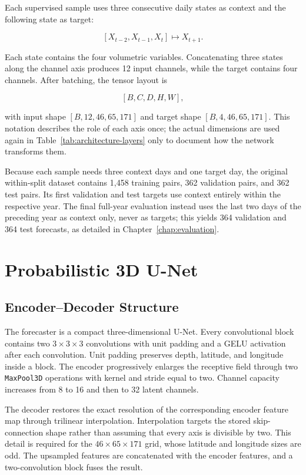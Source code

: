 Each supervised sample uses three consecutive daily states as context and the following state as target:

\[
[X_{t-2},X_{t-1},X_t] \longmapsto X_{t+1}.
\]

Each state contains the four volumetric variables. Concatenating three states along the channel axis produces 12 input channels, while the target contains four channels. After batching, the tensor layout is

\[
[B,C,D,H,W],
\]

with input shape $[B,12,46,65,171]$ and target shape $[B,4,46,65,171]$. This notation describes the role of each axis once; the actual dimensions are used again in Table~\ref{tab:architecture-layers} only to document how the network transforms them.

Because each sample needs three context days and one target day, the original within-split dataset contains 1,458 training pairs, 362 validation pairs, and 362 test pairs. Its first validation and test targets use context entirely within the respective year. The final full-year evaluation instead uses the last two days of the preceding year as context only, never as targets; this yields 364 validation and 364 test forecasts, as detailed in Chapter~\ref{chap:evaluation}.

\section{Probabilistic 3D U-Net}

\subsection{Encoder--Decoder Structure}

The forecaster is a compact three-dimensional U-Net. Every convolutional block contains two $3\times3\times3$ convolutions with unit padding and a GELU activation after each convolution. Unit padding preserves depth, latitude, and longitude inside a block. The encoder progressively enlarges the receptive field through two \texttt{MaxPool3D} operations with kernel and stride equal to two. Channel capacity increases from 8 to 16 and then to 32 latent channels.

The decoder restores the exact resolution of the corresponding encoder feature map through trilinear interpolation. Interpolation targets the stored skip-connection shape rather than assuming that every axis is divisible by two. This detail is required for the $46\times65\times171$ grid, whose latitude and longitude sizes are odd. The upsampled features are concatenated with the encoder features, and a two-convolution block fuses the result.

